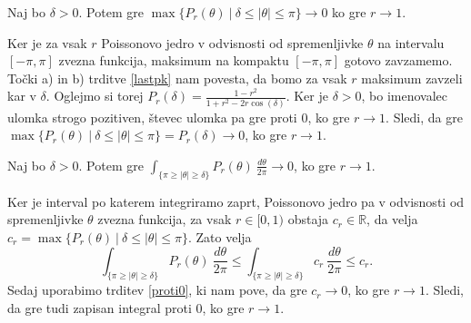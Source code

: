 \documentclass[mat1, tisk]{fmfdelo}
\begin{document}
    \begin{trditev}
        \label{proti0}
        Naj bo $\delta > 0$. Potem gre $\max\{P_r(\theta)~|~ \delta \leq |\theta| \leq \pi\} \to 0$ ko gre $r \to 1$.
    \end{trditev}
    \begin{dokaz}
        Ker je za vsak $r$ Poissonovo jedro v odvisnosti od spremenljivke $\theta$ na intervalu $[-\pi, \pi]$ zvezna funkcija, maksimum na kompaktu $[-\pi, \pi]$ gotovo zavzamemo. Točki a) in b) trditve \ref{lastpk} nam povesta, da bomo za vsak $r$ maksimum zavzeli kar v $\delta$. 
        Oglejmo si torej $P_r(\delta) = \frac{1 -r^2}{1 + r^2 - 2r \cos(\delta)}$. Ker je $\delta >0 $, bo imenovalec ulomka strogo pozitiven, števec ulomka pa gre proti $0$, ko gre $r \to 1$. 
        Sledi, da gre \mbox{$\max\{P_r(\theta)~|~ \delta \leq |\theta| \leq \pi\} = P_r(\delta) \to 0$}, ko gre $r \to 1$.
    \end{dokaz}
    \begin{posledica}
        \label{int_proti0}
        Naj bo $\delta > 0$. Potem gre ${\int_{\{\pi \geq |\theta| \geq \delta\}}{P_{r}(\theta)~\frac{d\theta}{2 \pi}}} \to 0$, ko gre $r \to 1$.
    \end{posledica}
    \begin{dokaz}
        Ker je interval po katerem integriramo zaprt, Poissonovo jedro pa v odvisnosti od spremenljivke $\theta$ zvezna funkcija, za vsak $r \in [0,1)$ obstaja $c_r \in \mathbb{R}$, da velja $c_r = \max\{P_r(\theta)~|~ \delta \leq |\theta| \leq \pi\}$. Zato velja
        $$
        {\int_{\{\pi \geq |\theta| \geq \delta\}}{P_{r}(\theta)~\frac{d\theta}{2 \pi}}} \leq {\int_{\{\pi \geq |\theta| \geq \delta\}}{c_r~\frac{d\theta}{2 \pi}}} \leq c_r.
        $$
        Sedaj uporabimo trditev \ref{proti0}, ki nam pove, da gre $c_r \to 0$, ko gre $r \to 1$. Sledi, da gre tudi zapisan integral proti $0$, ko gre $r \to 1$.
    \end{dokaz}
\end{document}
